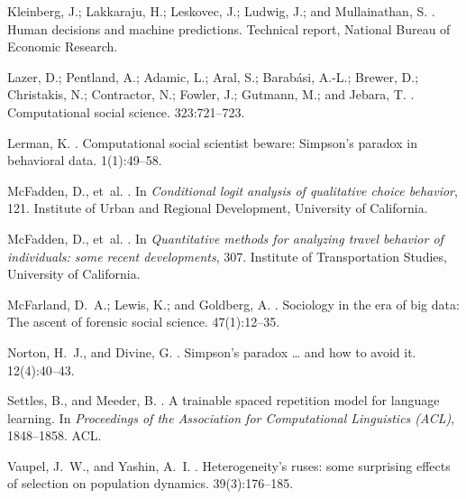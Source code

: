 \documentclass[letterpaper]{article} %
\begin{document}
\begin{thebibliography}{}
Kleinberg, J.; Lakkaraju, H.; Leskovec, J.; Ludwig, J.; and Mullainathan, S.
.
\newblock Human decisions and machine predictions.
\newblock Technical report, National Bureau of Economic Research.

Lazer, D.; Pentland, A.; Adamic, L.; Aral, S.; Barab\'{a}si, A.-L.; Brewer, D.;
  Christakis, N.; Contractor, N.; Fowler, J.; Gutmann, M.; and Jebara, T.
.
\newblock Computational social science.
 323:721--723.

Lerman, K.
.
\newblock Computational social scientist beware: Simpson's paradox in
  behavioral data.
 1(1):49--58.

McFadden, D., et~al.
.
\newblock In {\em Conditional logit analysis of qualitative choice behavior},
  121.
\newblock Institute of Urban and Regional Development, University of
  California.

McFadden, D., et~al.
.
\newblock In {\em Quantitative methods for analyzing travel behavior of
  individuals: some recent developments},  307.
\newblock Institute of Transportation Studies, University of California.

McFarland, D.~A.; Lewis, K.; and Goldberg, A.
.
\newblock Sociology in the era of big data: The ascent of forensic social
  science.
 47(1):12--35.

Norton, H.~J., and Divine, G.
.
\newblock Simpson's paradox … and how to avoid it.
 12(4):40--43.

Settles, B., and Meeder, B.
.
\newblock A trainable spaced repetition model for language learning.
\newblock In {\em Proceedings of the Association for Computational Linguistics
  (ACL)},  1848--1858.
\newblock ACL.

Vaupel, J.~W., and Yashin, A.~I.
.
\newblock Heterogeneity's ruses: some surprising effects of selection on
  population dynamics.
 39(3):176--185.

\end{thebibliography}
\end{document}
